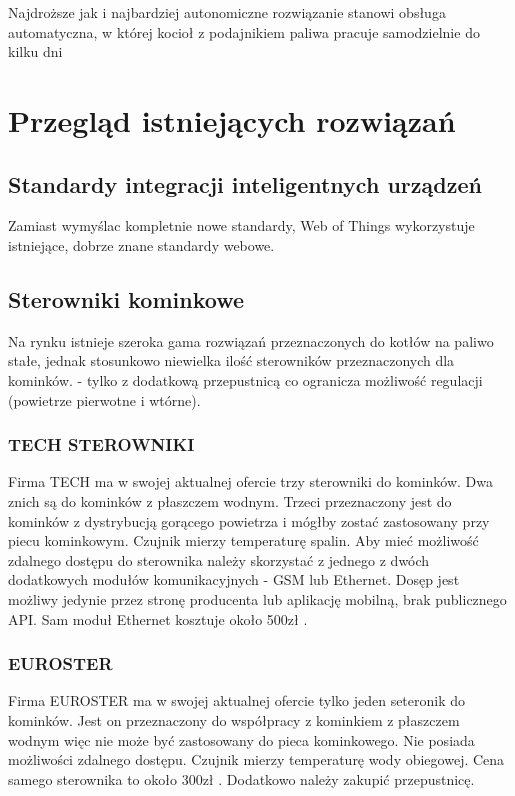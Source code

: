 \documentclass[12pt]{report}
\begin{document}
 Najdroższe jak i najbardziej autonomiczne rozwiązanie stanowi obsługa automatyczna, w której kocioł z podajnikiem paliwa pracuje samodzielnie do kilku dni
 
 
 \chapter{Przegląd istniejących rozwiązań} 
 \section{Standardy integracji inteligentnych urządzeń}
 Zamiast wymyślac kompletnie nowe standardy, Web of Things wykorzystuje istniejące, dobrze znane standardy webowe.
  
 \section{Sterowniki kominkowe}
 Na rynku istnieje szeroka gama rozwiązań przeznaczonych do kotłów na paliwo stałe, jednak stosunkowo niewielka ilość sterowników przeznaczonych dla kominków. - tylko z dodatkową przepustnicą co ogranicza możliwość regulacji (powietrze pierwotne i wtórne).
 \subsection{TECH STEROWNIKI}
 Firma TECH ma w swojej aktualnej ofercie \cite{Tech} trzy sterowniki do kominków. Dwa znich są do kominków z płaszczem wodnym. Trzeci \cite{TechSterownik} przeznaczony jest do kominków z dystrybucją gorącego powietrza i mógłby zostać zastosowany przy piecu kominkowym. Czujnik mierzy temperaturę spalin.
 Aby mieć możliwość zdalnego dostępu do sterownika należy skorzystać z jednego z dwóch dodatkowych modułów komunikacyjnych - GSM lub Ethernet. Dosęp jest możliwy jedynie przez stronę producenta lub aplikację mobilną, brak publicznego API.
 Sam moduł Ethernet kosztuje około 500zł \cite{TechEthernetCena}.
 \subsection{EUROSTER}
 Firma EUROSTER ma w swojej aktualnej ofercie \cite{Euroster} tylko jeden seteronik do kominków. Jest on \cite{EurosterSterownik} przeznaczony do współpracy z kominkiem z płaszczem wodnym więc nie może być zastosowany do pieca kominkowego. Nie posiada możliwości zdalnego dostępu. Czujnik mierzy temperaturę wody obiegowej.
 Cena samego sterownika to około 300zł \cite{EurosterSterownikCena}. Dodatkowo należy zakupić przepustnicę.
\end{document}
